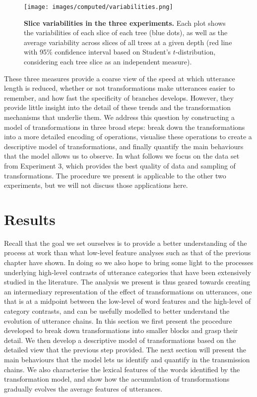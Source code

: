 \begin{figure}[!ht]
  \centering
  \texttt{[image: images/computed/variabilities.png]}
  \caption[Slice variabilities in the three experiments]{
  \textbf{Slice variabilities in the three experiments.}
  Each plot shows the variabilities of each slice of each tree (blue dots), as well as the average variability across slices of all trees at a given depth (red line with 95\% confidence interval based on Student's $t$-distribution, considering each tree slice as an independent measure).
  }
  \label{fig:gistr-variabilities}
\end{figure}

These three measures provide a coarse view of the speed at which
utterance length is reduced, whether or not transformations make
utterances easier to remember, and how fast the specificity of branches
develops. However, they provide little insight into the detail of these
trends and the transformation mechanisms that underlie them. We address
this question by constructing a model of transformations in three broad
steps: break down the transformations into a more detailed encoding of
operations, visualise these operations to create a descriptive model of
transformations, and finally quantify the main behaviours that the model
allows us to observe. In what follows we focus on the data set from
Experiment 3, which provides the best quality of data and sampling of
transformations. The procedure we present is applicable to the other two
experiments, but we will not discuss those applications here.



\section{Results}\label{sec:gistr-results}

Recall that the goal we set ourselves is to provide a better
understanding of the process at work than what low-level feature
analyses such as that of the previous chapter have shown. In doing so we
also hope to bring some light to the processes underlying high-level
contrasts of utterance categories that have been extensively studied in
the literature. The analysis we present is thus geared towards creating
an intermediary representation of the effect of transformations on
utterances, one that is at a midpoint between the low-level of word
features and the high-level of category contrasts, and can be usefully
modelled to better understand the evolution of utterance chains.
In this section we first present the procedure developed to break down transformations into smaller blocks and grasp
their detail. We then develop a descriptive model of transformations
based on the detailed view that the previous step provided.
The next section will present the main behaviours that the model lets
us identify and quantify in the transmission chains. We also characterise the
lexical features of the words identified by the transformation model,
and show how the accumulation of transformations gradually evolves the
average features of utterances.


